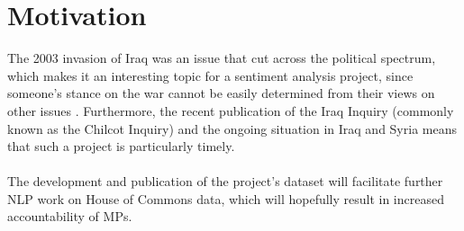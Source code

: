 \documentclass[12pt,a4paper,twoside,openright]{report}
\begin{document}
\section{Motivation}

The 2003 invasion of Iraq was an issue that cut across the political spectrum, which makes it an interesting topic for a sentiment analysis project, since someone's stance on the war cannot be easily determined from their views on other issues \cite{mp_votes_bbc}. Furthermore, the recent publication of the Iraq Inquiry (commonly known as the Chilcot Inquiry) \cite{chilcot2016report} and the ongoing situation in Iraq and Syria \cite{syria_iraq_air_strikes} means that such a project is particularly timely.
\\\\
The development and publication of the project's dataset will facilitate further NLP work on House of Commons data, which will hopefully result in increased accountability of MPs.
\end{document}
